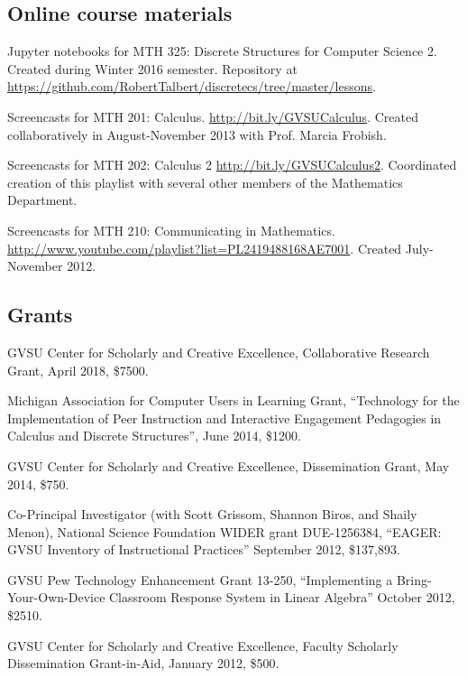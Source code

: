 \documentclass[letterpaper]{article}
\renewenvironment{itemize}{
  \begin{list}{}{
    \setlength{\leftmargin}{1.5em}
	\setlength{\itemsep}{0in}
  }
}{
  \end{list}
}
\begin{document}
\subsection*{Online course materials}
\begin{itemize}
	\item Jupyter notebooks for MTH 325: Discrete Structures for Computer Science 2. Created during Winter 2016 semester. Repository at \url{https://github.com/RobertTalbert/discretecs/tree/master/lessons}.
	\item Screencasts for MTH 201: Calculus. \url{http://bit.ly/GVSUCalculus}. Created collaboratively in August-November 2013 with Prof. Marcia Frobish.
	\item Screencasts for MTH 202: Calculus 2 \url{http://bit.ly/GVSUCalculus2}. Coordinated creation of this playlist with several other members of the Mathematics Department.
	\item Screencasts for MTH 210: Communicating in Mathematics. \url{http://www.youtube.com/playlist?list=PL2419488168AE7001}. Created July-November 2012.
\end{itemize}


\subsection*{Grants}
\begin{itemize}
	\item GVSU Center for Scholarly and Creative Excellence, Collaborative Research Grant, April 2018, \$7500. 
	\item Michigan Association for Computer Users in Learning Grant, ``Technology for the Implementation of Peer Instruction and Interactive Engagement Pedagogies in Calculus and Discrete Structures'', June 2014, \$1200.
	\item GVSU Center for Scholarly and Creative Excellence, Dissemination Grant, May 2014, \$750.
	\item Co-Principal Investigator (with Scott Grissom, Shannon Biros, and Shaily Menon), National Science Foundation WIDER grant DUE-1256384, ``EAGER: GVSU Inventory of Instructional Practices'' September 2012, \$137,893.
	\item GVSU Pew Technology Enhancement Grant 13-250, ``Implementing a Bring-Your-Own-Device Classroom Response System in Linear Algebra'' October 2012, \$2510.
	\item GVSU Center for Scholarly and Creative Excellence, Faculty Scholarly Dissemination Grant-in-Aid, January 2012, \$500.
\end{itemize}
\end{document}
